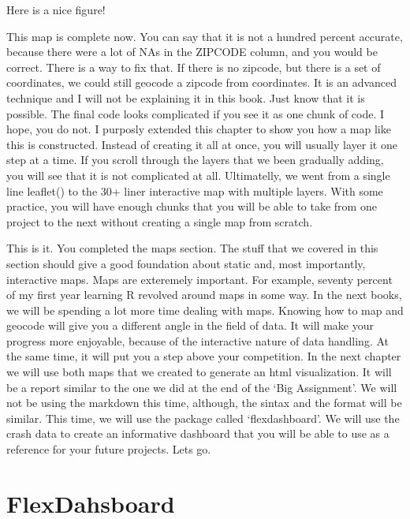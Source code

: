 \documentclass[]{book}
\begin{document}
\hypertarget{htmlwidget-44d610ec7502fdb5f05a}{}

\label{fig:nice-fig94}Here is a nice figure!

This map is complete now. You can say that it is not a hundred percent accurate, because there were a lot of NAs in the ZIPCODE column, and you would be correct. There is a way to fix that. If there is no zipcode, but there is a set of coordinates, we could still geocode a zipcode from coordinates. It is an advanced technique and I will not be explaining it in this book. Just know that it is possible. The final code looks complicated if you see it as one chunk of code. I hope, you do not. I purposly extended this chapter to show you how a map like this is constructed. Instead of creating it all at once, you will usually layer it one step at a time. If you scroll through the layers that we been gradually adding, you will see that it is not complicated at all. Ultimatelly, we went from a single line leaflet() to the 30+ liner interactive map with multiple layers. With some practice, you will have enough chunks that you will be able to take from one project to the next without creating a single map from scratch.

This is it. You completed the maps section. The stuff that we covered in this section should give a good foundation about static and, most importantly, interactive maps. Maps are exteremely important. For example, seventy percent of my first year learning R revolved around maps in some way. In the next books, we will be spending a lot more time dealing with maps. Knowing how to map and geocode will give you a different angle in the field of data. It will make your progress more enjoyable, because of the interactive nature of data handling. At the same time, it will put you a step above your competition. In the next chapter we will use both maps that we created to generate an html visualization. It will be a report similar to the one we did at the end of the `Big Assignment'. We will not be using the markdown this time, although, the sintax and the format will be similar. This time, we will use the package called `flexdashboard'. We will use the crash data to create an informative dashboard that you will be able to use as a reference for your future projects. Lets go.

\hypertarget{flexdahsboard}{%
\chapter{FlexDahsboard}\label{flexdahsboard}}
\end{document}
